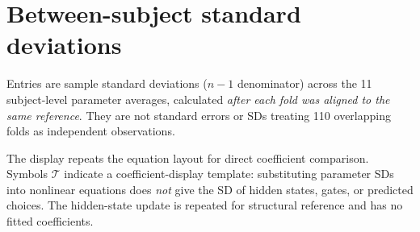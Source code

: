 \documentclass[10pt,a4paper]{article}
\begin{document}
\newpage
\section*{Between-subject standard deviations}
Entries are sample standard deviations ($n-1$ denominator) across the 11 subject-level parameter averages, calculated \emph{after each fold was aligned to the same reference}. They are not standard errors or SDs treating 110 overlapping folds as independent observations.

The display repeats the equation layout for direct coefficient comparison. Symbols $\mathcal T$ indicate a coefficient-display template: substituting parameter SDs into nonlinear equations does \emph{not} give the SD of hidden states, gates, or predicted choices. The hidden-state update is repeated for structural reference and has no fitted coefficients.
\begingroup\small\setlength{\arraycolsep}{3pt}
\end{document}
